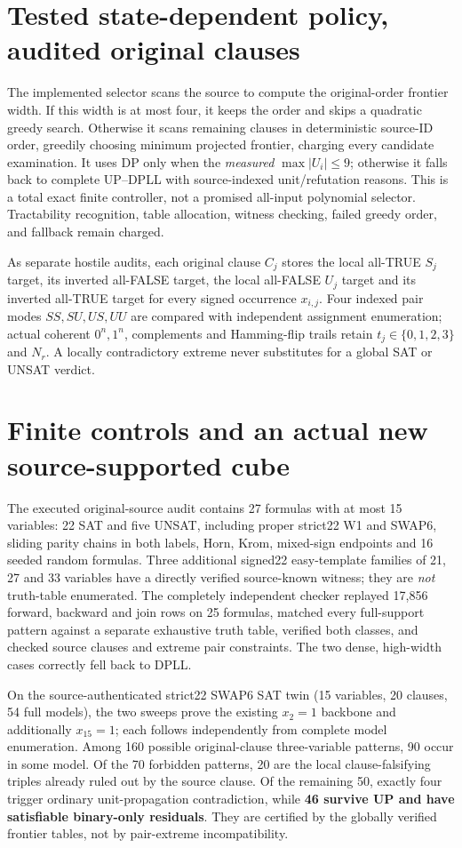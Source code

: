 \documentclass[10pt]{article}
\begin{document}
\section{Tested state-dependent policy, audited original clauses}
The implemented selector scans the source to compute the original-order frontier width. If this width is at most four, it keeps the order and skips a quadratic greedy search. Otherwise it scans remaining clauses in deterministic source-ID order, greedily choosing minimum projected frontier, charging every candidate examination. It uses DP only when the \emph{measured} $\max|U_i|\le9$; otherwise it falls back to complete UP--DPLL with source-indexed unit/refutation reasons. This is a total exact finite controller, not a promised all-input polynomial selector. Tractability recognition, table allocation, witness checking, failed greedy order, and fallback remain charged.

As separate hostile audits, each original clause $C_j$ stores the local all-TRUE $S_j$ target, its inverted all-FALSE target, the local all-FALSE $U_j$ target and its inverted all-TRUE target for every signed occurrence $x_{i,j}$. Four indexed pair modes $SS,SU,US,UU$ are compared with independent assignment enumeration; actual coherent $0^n,1^n$, complements and Hamming-flip trails retain $t_j\in\{0,1,2,3\}$ and $N_r$. A locally contradictory extreme never substitutes for a global SAT or UNSAT verdict.

\section{Finite controls and an actual new source-supported cube}
The executed original-source audit contains 27 formulas with at most 15 variables: 22 SAT and five UNSAT, including proper strict22 W1 and SWAP6, sliding parity chains in both labels, Horn, Krom, mixed-sign endpoints and 16 seeded random formulas. Three additional signed22 easy-template families of 21, 27 and 33 variables have a directly verified source-known witness; they are \emph{not} truth-table enumerated. The completely independent checker replayed 17,856 forward, backward and join rows on 25 formulas, matched every full-support pattern against a separate exhaustive truth table, verified both classes, and checked source clauses and extreme pair constraints. The two dense, high-width cases correctly fell back to DPLL.

On the source-authenticated strict22 SWAP6 SAT twin (15 variables, 20 clauses, 54 full models), the two sweeps prove the existing $x_2=1$ backbone and additionally $x_{15}=1$; each follows independently from complete model enumeration. Among 160 possible original-clause three-variable patterns, 90 occur in some model. Of the 70 forbidden patterns, 20 are the local clause-falsifying triples already ruled out by the source clause. Of the remaining 50, exactly four trigger ordinary unit-propagation contradiction, while \textbf{46 survive UP and have satisfiable binary-only residuals}. They are certified by the globally verified frontier tables, not by pair-extreme incompatibility.
\end{document}
